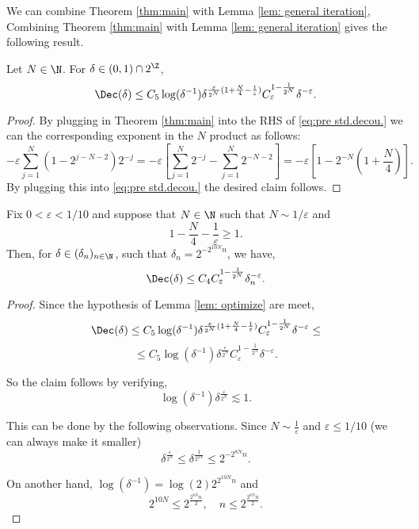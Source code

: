 We can combine Theorem \ref{thm:main} with Lemma \ref{lem: general iteration},
Combining Theorem \ref{thm:main} with Lemma \ref{lem: general iteration} gives the following result.
\begin{lem}\label{lem: optimize}
Let $N \in \N$. For $\delta \in (0,1)\cap 2^{\Z}$,
\begin{equation}
    \Dec(\delta)\leq C_5 \log(\delta^{-1})\delta^{\frac{\varepsilon}{2^N}(1 + \frac{N}{4}-\frac{1}{\varepsilon})} C_{\varepsilon}^{1-\frac{1}{2^N}} \delta^{-\varepsilon}. 
\end{equation}
\end{lem}
\begin{proof}
    By plugging in Theorem \ref{thm:main} into the RHS of \ref{eq:pre std.decou.} we can the corresponding exponent in the $N$ product as follows:
    \begin{equation}
        -\varepsilon  \sum_{j=1}^{N}(1-2^{j-N-2})2^{-j} = -\varepsilon \left[\sum_{j=1}^{N}2^{-j} - \sum_{j=1}^{N}2^{-N-2}\right] = -\varepsilon [1- 2^{-N}(1+\frac{N}{4})].
    \end{equation}
    By plugging this into \ref{eq:pre std.decou.} the desired claim follows.
\end{proof}
\begin{lem}\label{lem:dyadic prop}
    Fix $0<\varepsilon<1/10$ and suppose that $N\in \N$ such that $N \sim 1/\varepsilon$ and 
    $$
    1-\frac{N}{4}-\frac{1}{\varepsilon}\geq 1.
    $$
    Then, for $\delta \in (\delta_n)_{n\in\N}$, such that $\delta_n = 2^{-2^{10N}n}$, we have,
    $$
    \Dec(\delta) \leq C_4 C_{\varepsilon}^{1-\frac{1}{2^N}} \delta_{n}^{-\varepsilon}.
    $$
\end{lem}
\begin{proof}
    Since the hypothesis of Lemma \ref{lem: optimize} are meet,
    $$
     \Dec(\delta)\leq C_5 \log(\delta^{-1})\delta^{\frac{\varepsilon}{2^N}(1 + \frac{N}{4}-\frac{1}{\varepsilon})} C_{\varepsilon}^{1-\frac{1}{2^N}} \delta^{-\varepsilon} \leq 
    $$
    $$
    \leq C_5 \log(\delta^{-1})\delta^{\frac{\varepsilon}{2^N}} C_{\varepsilon}^{1-\frac{1}{2^N}} \delta^{-\varepsilon}. 
    $$

    So  the claim follows by verifying,
    $$
    \log(\delta^{-1})\delta^{\frac{\varepsilon}{2^N}} \lesssim 1.
    $$

    This can be done by the following observations. Since $N\sim \frac{1}{\varepsilon}$ and $\varepsilon \leq 1/10$ (we can always make it smaller) 
    $$
    \delta^{\frac{\varepsilon}{2^N}} \leq \delta^{\frac{1}{2^{2N}}}\leq 2^{-2^{8N}n}.
    $$

    On another hand, $\log(\delta^{-1})=\log(2) 2^{2^{10N}n}$ and 
    $$
    2^{10N}\leq 2^{\frac{2^{8N}n}{2}}, \quad n\leq 2^\frac{2^{8N}n}{2}.
    $$
\end{proof}


